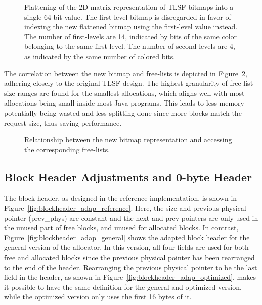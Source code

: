 \begin{figure}[H]
    \centering
    
    \vspace*{4mm}
    \caption{Flattening of the 2D-matrix representation of TLSF bitmaps into a single 64-bit value. The first-level bitmap is disregarded in favor of indexing the new flattened bitmap using the first-level value instead. The number of first-levels are 14, indicated by bits of the same color belonging to the same first-level. The number of second-levels are 4, as indicated by the same number of colored bits.}
    \label{fig:bitmap_flattening}
\end{figure}

The correlation between the new bitmap and free-lists is depicted in Figure~\ref{fig:bitmap_relationship}, adhering closely to the original TLSF design. The highest granularity of free-list size-ranges are found for the smallest allocations, which aligns well with most allocations being small inside most Java programs. This leads to less memory potentially being wasted and less splitting done since more blocks match the request size, thus saving performance.

\begin{figure}[H]
    \centering
    \vspace*{0.2cm}
    
    \vspace*{1mm}
    \caption{Relationship between the new bitmap representation and accessing the corresponding free-lists.}
    \label{fig:bitmap_relationship}
\end{figure}

\subsection{Block Header Adjustments and 0-byte Header}
\label{sec:adaptations_impl:0-byte-header}

The block header, as designed in the reference implementation, is shown in Figure~\ref{fig:blockheader_adap_reference}. Here, the size and previous physical pointer (prev\_phys) are constant and the next and prev pointers are only used in the unused part of free blocks, and unused for allocated blocks. In contrast, Figure~\ref{fig:blockheader_adap_general} shows the adapted block header for the general version of the allocator. In this version, all four fields are used for both free and allocated blocks since the previous physical pointer has been rearranged to the end of the header. Rearranging the previous physical pointer to be the last field in the header, as shown in Figure~\ref{fig:blockheader_adap_optimized}, makes it possible to have the same definition for the general and optimized version, while the optimized version only uses the first 16 bytes of it.

